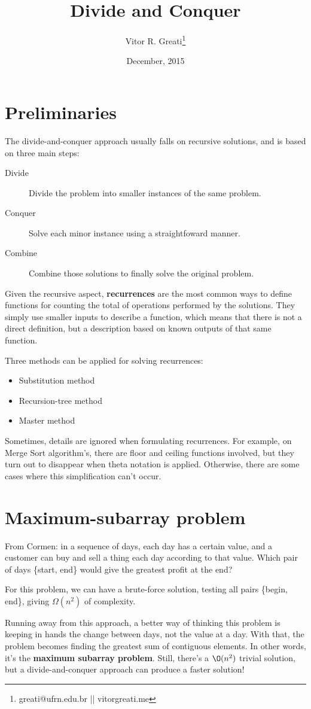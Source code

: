 \documentclass{article}
\begin{document}
\title{Divide and Conquer}
\author{Vitor R. Greati\thanks{greati@ufrn.edu.br || vitorgreati.me}}
\date{December, 2015}

\maketitle

\section{Preliminaries}

The divide-and-conquer approach usually falls on recursive solutions, and is based on three main
steps:
\begin{description}
	\item[Divide] Divide the problem into smaller instances of the same problem.
	\item[Conquer] Solve each minor instance using a straightfoward manner.
	\item[Combine] Combine those solutions to finally solve the original problem.
\end{description}

Given the recursive aspect, \textbf{recurrences} are the most common ways to define functions for
counting the total of operations performed by the solutions. They simply use smaller inputs to describe
a function, which means that there is not a direct definition, but a description based on known outputs
of that same function.

Three methods can be applied for solving recurrences:
\begin{itemize}
	\item{Substitution method}
	\item{Recursion-tree method}
	\item{Master method}
\end{itemize}

Sometimes, details are ignored when formulating recurrences. For example, on Merge Sort algorithm's,
there are floor and ceiling functions involved, but they turn out to disappear when theta notation
is applied. Otherwise, there are some cases where this simplification can't occur.

\section{Maximum-subarray problem}
From Cormen: in a sequence of days, each day has a certain value, and a customer can buy and sell
a thing each day according to that value. Which pair of days \{start, end\} would give the greatest profit at
the end?

For this problem, we can have a brute-force solution, testing all pairs \{begin, end\},
giving $\Omega(n^2)$ of complexity.

Running away from this approach, a better way of thinking this problem is keeping in hands the change
between days, not the value at a day. With that, the problem becomes finding the greatest sum of
contiguous elements. In other words, it's the \textbf{maximum subarray problem}. Still, there's a $\O(n^2)$ trivial solution,
but a divide-and-conquer approach can produce a faster solution!
\end{document}
